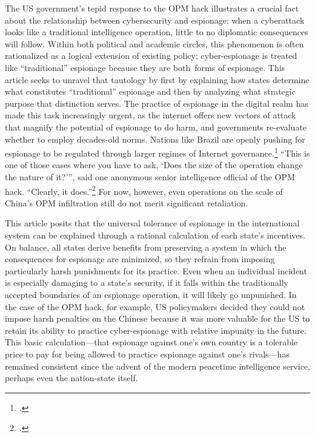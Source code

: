 \documentclass[14pt]{extarticle}
\begin{document}
The US government's tepid response to the OPM hack illustrates a crucial fact about the relationship between cybersecurity and espionage: when a cyberattack looks like a traditional intelligence operation, little to no diplomatic consequences will follow. Within both political and academic circles, this phenomenon is often rationalized as a logical extension of existing policy; cyber-espionage is treated like \enquote{traditional} espionage because they are both forms of espionage. This article seeks to unravel that tautology by first by explaining how states determine what constitutes \enquote{traditional} espionage and then by analyzing what strategic purpose that distinction serves. The practice of espionage in the digital realm has made this task increasingly urgent, as the internet offers new vectors of attack that magnify the potential of espionage to do harm, and governments re-evaluate whether to employ decades-old norms. Nations like Brazil are openly pushing for espionage to be regulated through larger regimes of Internet governance.\footcite[p.~464]{abdenur_triggering_2015} ``This is one of those cases where you have to ask, `Does the size of the operation change the nature of it?'\thinspace'', said one anonymous senior intelligence official of the OPM hack. \enquote{Clearly, it does.}\footcite{sanger_u.s._2015} For now, however, even operations on the scale of China's OPM infiltration still do not merit significant retaliation.

This article posits that the universal tolerance of espionage in the international system can be explained through a rational calculation of each state's incentives. On balance, all states derive benefits from preserving a system in which the consequences for espionage are minimized, so they refrain from imposing particularly harsh punishments for its practice. Even when an individual incident is especially damaging to a state's security, if it falls within the traditionally accepted boundaries of an espionage operation, it will likely go unpunished. In the case of the OPM hack, for example, US policymakers decided they could not impose harsh penalties on the Chinese because it was more valuable for the US to retain its ability to practice cyber-espionage with relative impunity in the future. This basic calculation---that espionage against one's own country is a tolerable price to pay for being allowed to practice espionage against one's rivals---has remained consistent since the advent of the modern peacetime intelligence service, perhaps even the nation-state itself.
\end{document}

